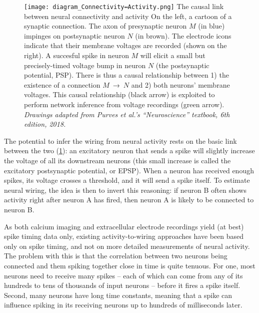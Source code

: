 \begin{figure}
    \vspace*{2em}  %
    \hspace*{-2.5em}
    \texttt{[image: diagram\_Connectivity↔Activity.png]}
    \captionn
        {The causal link between neural connectivity and activity}
        {On the left, a cartoon of a synaptic connection. The axon of presynaptic neuron $M$ (in blue) impinges on postsynaptic neuron $N$ (in brown). The electrode icons indicate that their membrane voltages are recorded (shown on the right).
        A succesful spike in neuron $M$ will elicit a small but precisely-timed voltage bump in neuron $N$ (the postsynaptic potential, PSP).
        There is thus a causal relationship between 1) the existence of a connection $M$~→~$N$ and 2) both neurons' membrane voltages. This causal relationship (black arrow) is exploited to perform network inference from voltage recordings (green arrow).\newline
        \small{\emph{Drawings adapted from Purves et al.'s ``Neuroscience'' textbook, 6th edition, 2018.}}}
    \label{fig:diagram_Connectivity-Activity}
\end{figure}

The potential to infer the wiring from neural activity rests on the basic link between the two (\cref{fig:diagram_Connectivity-Activity}): an excitatory neuron that sends a spike will slightly increase the voltage of all its downstream neurons (this small increase is called the excitatory postsynaptic potential, or EPSP). When a neuron has received enough spikes, its voltage crosses a threshold, and it will send a spike itself. To estimate neural wiring, the idea is then to invert this reasoning: if neuron B often shows activity right after neuron A has fired, then neuron A is likely to be connected to neuron B.

As both calcium imaging and extracellular electrode recordings yield (at best) spike timing data only, existing activity-to-wiring approaches have been based only on spike timing, and not on more detailed measurements of neural activity. The problem with this is that the correlation between two neurons being connected and them spiking together close in time is quite tenuous. For one, most neurons need to receive many spikes – each of which can come from any of its hundreds to tens of thousands of input neurons – before it fires a spike itself. Second, many neurons have long time constants, meaning that a spike can influence spiking in its receiving neurons up to hundreds of milliseconds later.

